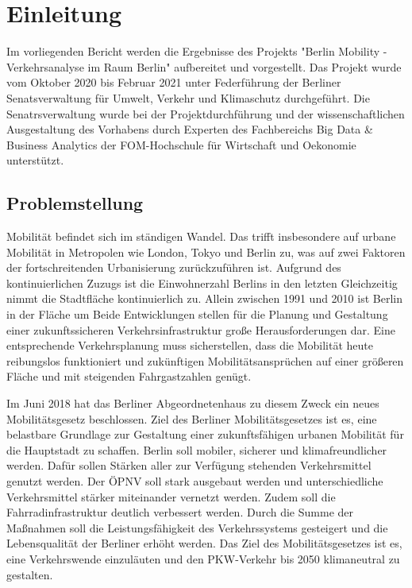 \section{Einleitung}
Im vorliegenden Bericht werden die Ergebnisse des Projekts "Berlin Mobility - Verkehrsanalyse im Raum Berlin" aufbereitet und vorgestellt. Das Projekt wurde vom Oktober 2020 bis Februar 2021 unter Federführung der Berliner Senatsverwaltung für Umwelt, Verkehr und Klimaschutz durchgeführt. Die Senatrsverwaltung wurde bei der Projektdurchführung und der wissenschaftlichen Ausgestaltung des Vorhabens durch Experten des Fachbereichs Big Data \& Business Analytics der FOM-Hochschule für Wirtschaft und Oekonomie unterstützt. 


\subsection{Problemstellung}
Mobilität befindet sich im ständigen Wandel. Das trifft insbesondere auf urbane Mobilität in Metropolen wie London, Tokyo und Berlin zu, was auf zwei Faktoren der fortschreitenden Urbanisierung zurückzuführen ist. Aufgrund des kontinuierlichen Zuzugs ist die Einwohnerzahl Berlins in den letzten  Gleichzeitig nimmt die Stadtfläche kontinuierlich zu. Allein zwischen 1991 und 2010 ist Berlin in der Fläche um   Beide Entwicklungen stellen für die Planung und Gestaltung einer zukunftssicheren Verkehrsinfrastruktur große Herausforderungen dar. Eine entsprechende Verkehrsplanung muss sicherstellen, dass die Mobilität heute reibungslos funktioniert und zukünftigen Mobilitätsansprüchen auf einer größeren Fläche und mit steigenden Fahrgastzahlen genügt. 

Im Juni 2018 hat das Berliner Abgeordnetenhaus zu diesem Zweck ein neues Mobilitätsgesetz beschlossen. Ziel des Berliner Mobilitätsgesetzes ist es, eine belastbare Grundlage zur Gestaltung einer zukunftsfähigen urbanen Mobilität für die Hauptstadt zu schaffen. Berlin soll mobiler, sicherer und klimafreundlicher werden. Dafür sollen Stärken aller zur Verfügung stehenden Verkehrsmittel genutzt werden. Der ÖPNV soll stark ausgebaut werden und unterschiedliche Verkehrsmittel stärker miteinander vernetzt werden. Zudem soll die Fahrradinfrastruktur deutlich verbessert werden. Durch die Summe der Maßnahmen soll die Leistungsfähigkeit des Verkehrssystems gesteigert und die Lebensqualität der Berliner erhöht werden. Das Ziel des Mobilitätsgesetzes ist es, eine Verkehrswende einzuläuten und den PKW-Verkehr bis 2050 klimaneutral zu gestalten. 

